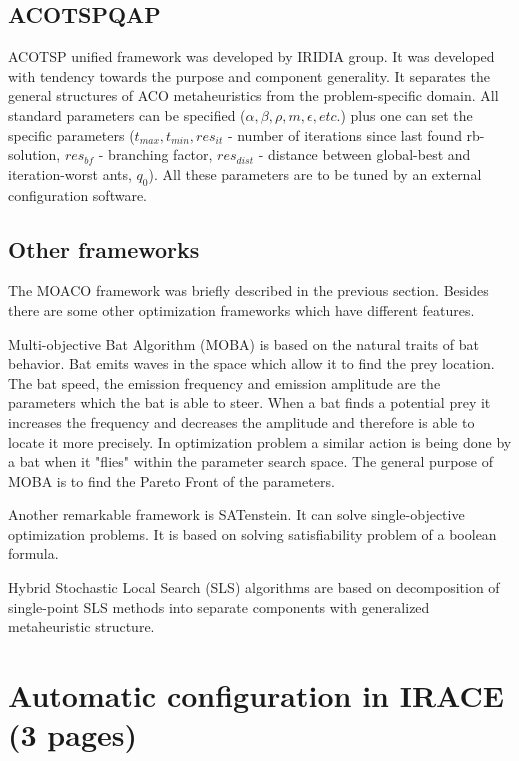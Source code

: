 \documentclass[12pt]{article}
\begin{document}
\subsection{ACOTSPQAP}

ACOTSP unified framework was developed by IRIDIA group. It was developed with tendency towards the purpose and component generality. It separates the general structures of ACO metaheuristics from the problem-specific domain. All standard parameters can be specified ($\alpha, \beta, \rho, m, \epsilon, etc.$) plus one can set the specific parameters ($t_{max}, t_{min}, res_{it}$ - number of iterations since last found rb-solution, $res_{bf}$ - branching factor, $res_{dist}$ - distance between global-best and iteration-worst ants, $q_0$). All these parameters are to be tuned by an external configuration software.

\subsection{Other frameworks}

The MOACO framework was briefly described in the previous section. Besides there are some other optimization frameworks which have different features.

Multi-objective Bat Algorithm (MOBA) is based on the natural traits of bat behavior. Bat emits waves in the space which allow it to find the prey location. The bat speed, the emission  frequency and emission amplitude are the parameters which the bat is able to steer. When a bat finds a potential prey it increases the frequency and decreases the amplitude and therefore is able to locate it more precisely. In optimization problem a similar action is being done by a bat when it "flies" within the parameter search space. The general purpose of MOBA is to find the Pareto Front of the parameters.

Another remarkable framework is SATenstein. It can solve single-objective optimization problems. It is based on solving satisfiability problem of a boolean formula.

Hybrid Stochastic Local Search (SLS) algorithms are based on decomposition of single-point SLS methods into separate components with generalized metaheuristic structure.


\section{Automatic configuration in IRACE (3 pages)}
\end{document}

